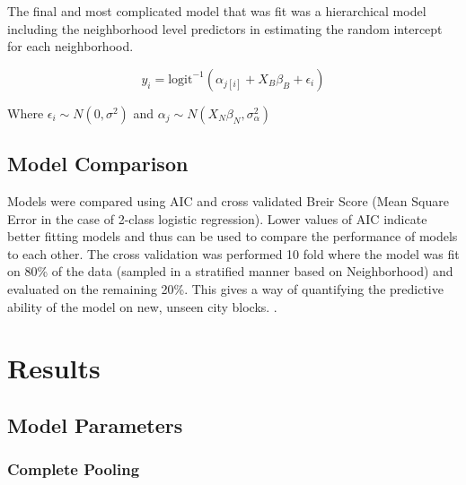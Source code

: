 \documentclass{report}
\begin{document}
The final and most complicated model that was fit was a hierarchical model including the neighborhood level predictors in estimating the random intercept for each neighborhood. 

$$ y_{i} = \text{logit}^{-1}\left( \alpha_{j[i]} + X_{B}\beta_{B} +  \epsilon_i \right) $$

Where $\epsilon_i \sim N(0, \sigma^2)$ and $\alpha_j \sim N(X_N \beta_N, \sigma^2_\alpha)$


\subsection*{Model Comparison}

Models were compared using AIC and cross validated Breir Score (Mean Square Error in the case of 2-class logistic regression). Lower values of AIC indicate better fitting models and thus can be used to compare the performance of models to each other. The cross validation was performed 10 fold where the model was fit on 80\% of the data (sampled in a stratified manner based on Neighborhood) and evaluated on the remaining 20\%. This gives a way of quantifying the predictive ability of the model on new, unseen city blocks. . 

\section*{Results}

\subsection*{Model Parameters}

\subsubsection*{Complete Pooling}
\end{document}
